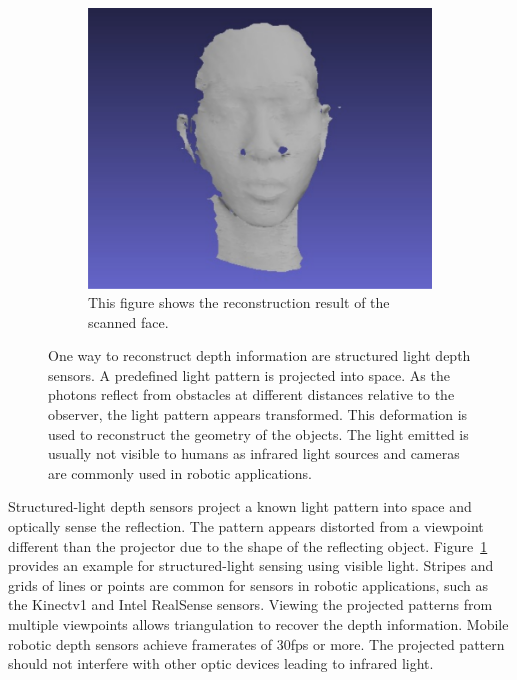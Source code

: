 \begin{figure}[H]
\begin{subfigure}[t]{0.45\textwidth}
        \includegraphics[width=\textwidth]{chapter03/img/depth_face_reconstructed.png}
        \caption{This figure shows the reconstruction result of the scanned face\cite{sl_depthsensor_calibration}.}
    \end{subfigure}
    \caption[Demonstration of visible light patterns used for structured-light depth sensors]{One way to reconstruct depth information are structured light depth sensors. A predefined light pattern is projected into space. As the photons reflect from obstacles at different distances relative to the observer, the light pattern appears transformed. This deformation is used to reconstruct the geometry of the objects. The light emitted is usually not visible to humans as infrared light sources and cameras are commonly used in robotic applications.\label{fig:sl_face}}
\end{figure}
Structured-light depth sensors project a known light pattern into space and optically sense the reflection.
The pattern appears distorted from a viewpoint different than the projector due to the shape of the reflecting object.
Figure~\ref{fig:sl_face} provides an example for structured-light sensing using visible light.
Stripes and grids of lines or points are common for sensors in robotic applications, such as the Kinectv1 and Intel RealSense\cite{intel_realsense} sensors.
Viewing the projected patterns from multiple viewpoints allows triangulation to recover the depth information.
Mobile robotic depth sensors achieve framerates of 30fps or more.
The projected pattern should not interfere with other optic devices leading to infrared light.

